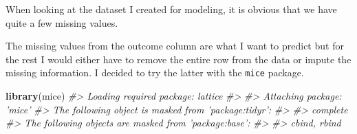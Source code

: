 \documentclass[]{book}
\newenvironment{Shaded}{\begin{snugshade}}{\end{snugshade}}
\newcommand{\CommentTok}[1]{\textcolor[rgb]{0.56,0.35,0.01}{\textit{#1}}}
\newcommand{\KeywordTok}[1]{\textcolor[rgb]{0.13,0.29,0.53}{\textbf{#1}}}
\newcommand{\NormalTok}[1]{#1}
\begin{document}
When looking at the dataset I created for modeling, it is obvious that we have quite a few missing values.

The missing values from the outcome column are what I want to predict but for the rest I would either have to remove the entire row from the data or impute the missing information. I decided to try the latter with the \texttt{mice} package.

\begin{Shaded}
\begin{Highlighting}[]
\KeywordTok{library}\NormalTok{(mice)}
\CommentTok{#> Loading required package: lattice}
\CommentTok{#> }
\CommentTok{#> Attaching package: 'mice'}
\CommentTok{#> The following object is masked from 'package:tidyr':}
\CommentTok{#> }
\CommentTok{#>     complete}
\CommentTok{#> The following objects are masked from 'package:base':}
\CommentTok{#> }
\CommentTok{#>     cbind, rbind}


\end{Highlighting}
\end{Shaded}
\end{document}

